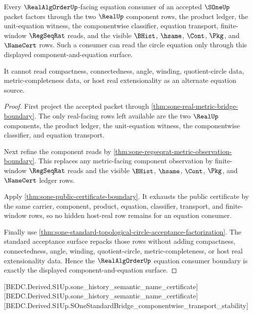 \begin{theorem}
\label{thm:sone-realalgorder-equation-consumer-boundary}
Every $\RealAlgOrderUp$-facing equation consumer of an accepted $\SOneUp$
packet factors through the two $\RealUp$ component rows, the product ledger,
the unit-equation witness, the componentwise classifier, equation transport,
finite-window $\RegSeqRat$ reads, and the visible $\BHist$, $\hsame$, $\Cont$,
$\Pkg$, and $\NameCert$ rows. Such a consumer can read the circle equation
only through this displayed component-and-equation surface.

It cannot read compactness, connectedness, angle, winding, quotient-circle
data, metric-completeness data, or host real extensionality as an alternate
equation source.
\end{theorem}
\begin{proof}
First project the accepted packet through
\autoref{thm:sone-real-metric-bridge-boundary}. The only real-facing rows left
available are the two $\RealUp$ components, the product ledger, the
unit-equation witness, the componentwise classifier, and equation transport.

Next refine the component reads by
\autoref{thm:sone-regseqrat-metric-observation-boundary}. This replaces any
metric-facing component observation by finite-window $\RegSeqRat$ reads and
the visible $\BHist$, $\hsame$, $\Cont$, $\Pkg$, and $\NameCert$ ledger rows.

Apply \autoref{thm:sone-public-certificate-boundary}. It exhausts the public
certificate by the same carrier, component, product, equation, classifier,
transport, and finite-window rows, so no hidden host-real row remains for an
equation consumer.

Finally use
\autoref{thm:sone-standard-topological-circle-acceptance-factorization}. The
standard acceptance surface repacks those rows without adding compactness,
connectedness, angle, winding, quotient-circle, metric-completeness, or host
real extensionality data. Hence the $\RealAlgOrderUp$ equation consumer
boundary is exactly the displayed component-and-equation surface.
\end{proof}

[BEDC.Derived.S1Up.sone\_history\_semantic\_name\_certificate]
[BEDC.Derived.S1Up.sone\_history\_semantic\_name\_certificate]
[BEDC.Derived.S1Up.SOneStandardBridge\_componentwise\_transport\_stability]

